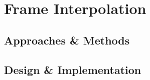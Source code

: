 \chapter{Frame Interpolation}
\label{chapterlabel6}
\section{Approaches \& Methods}
\section{Design \& Implementation}

